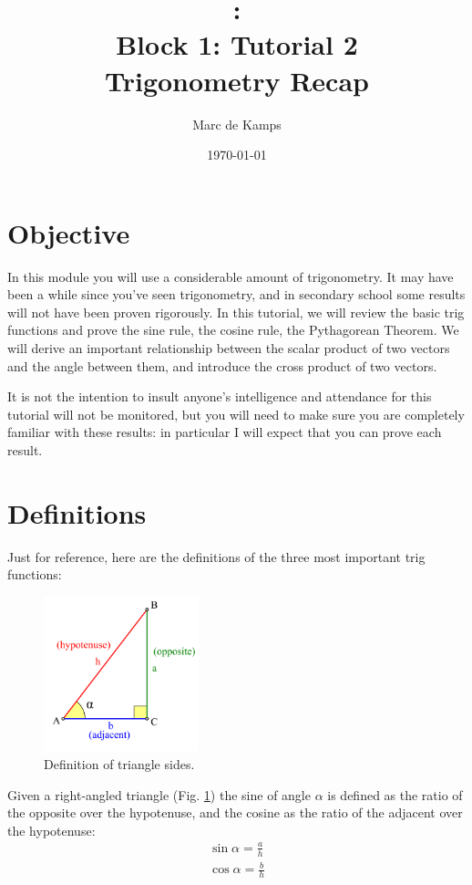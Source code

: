 \documentclass[a4wide]{article}
\title{\modulecode: \modulename\\
         Block 1: Tutorial  2\\
       Trigonometry Recap}
\author{Marc de Kamps}
\date{\today}
\begin{document}
\maketitle
\section*{Objective}
In this module you will use a considerable amount of trigonometry. It may have been a while since you've seen trigonometry, and 
in secondary school some results will not have been proven rigorously. In this tutorial, we will review the basic trig functions
and prove the sine rule, the cosine rule, the Pythagorean Theorem. We will derive an important relationship between the scalar product of two vectors
and the angle between them, and introduce the cross product of two vectors. 

It is not the intention to insult anyone's intelligence and attendance for this tutorial will not be monitored, but you will need to make sure you are completely familiar
with these results: in particular I will expect that you can prove each result.

\section*{Definitions}
Just for reference, here are the definitions of the three most important trig functions:
\begin{figure}[h]
  \begin{center}
\includegraphics[width=0.4\textwidth]{Trigono_sine_en2.pdf}
  \end{center}
  \caption{Definition of triangle sides.}
  \label{fig-rh}
\end{figure}
Given a right-angled triangle (Fig. \ref{fig-rh}) the sine of angle $\alpha$ is defined as the ratio of the opposite over the hypotenuse, and the cosine as the ratio of the adjacent over the
hypotenuse:
\begin{align}
  \sin \alpha = \frac{a}{h} \\ \nonumber
  \cos \alpha = \frac{b}{h} \nonumber
\end{align}
\end{document}
